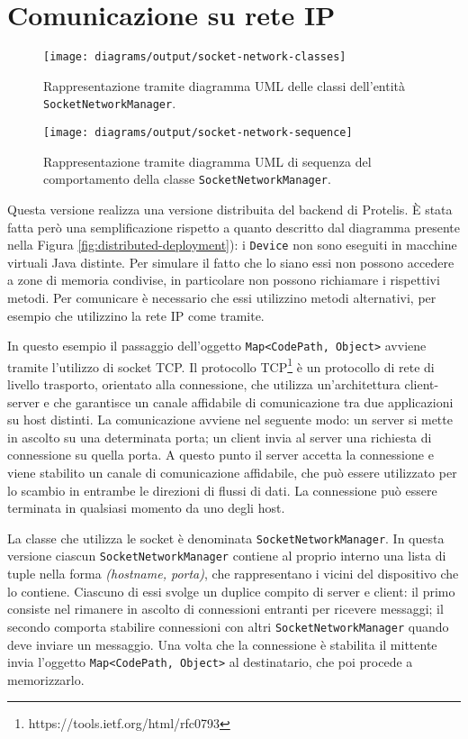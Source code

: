 \section{Comunicazione su rete IP}
\begin{figure}
  \centering
  \texttt{[image: diagrams/output/socket-network-classes]}
  \caption{Rappresentazione tramite diagramma UML delle classi dell'entità
    \texttt{SocketNetworkManager}.}
  \label{fig:socket-network-classes}
\end{figure}
\begin{figure}
  \centering
  \texttt{[image: diagrams/output/socket-network-sequence]}
  \caption{Rappresentazione tramite diagramma UML di sequenza del comportamento
    della classe \texttt{SocketNetworkManager}.}
  \label{fig:socket-network-sequence}
\end{figure}
Questa versione realizza una versione distribuita del backend di Protelis.  È
stata fatta però una semplificazione rispetto a quanto descritto dal diagramma
presente nella Figura \ref{fig:distributed-deployment}): i \texttt{Device} non
sono eseguiti in macchine virtuali Java distinte. Per simulare il fatto che lo
siano essi non possono accedere a zone di memoria condivise, in particolare non
possono richiamare i rispettivi metodi. Per comunicare è necessario che essi
utilizzino metodi alternativi, per esempio che utilizzino la rete IP come
tramite.

In questo esempio il passaggio dell'oggetto \texttt{Map<CodePath, Object>}
avviene tramite l'utilizzo di socket TCP. Il protocollo
TCP\footnote{https://tools.ietf.org/html/rfc0793} è un protocollo di rete di
livello trasporto, orientato alla connessione, che utilizza un'architettura
client-server e che garantisce un canale affidabile di comunicazione tra due
applicazioni su host distinti. La comunicazione avviene nel seguente modo: un
server si mette in ascolto su una determinata porta; un client invia al server
una richiesta di connessione su quella porta. A questo punto il server accetta
la connessione e viene stabilito un canale di comunicazione affidabile, che può
essere utilizzato per lo scambio in entrambe le direzioni di flussi di dati. La
connessione può essere terminata in qualsiasi momento da uno degli host.

La classe che utilizza le socket è denominata \texttt{SocketNetworkManager}. In
questa versione ciascun \texttt{SocketNetworkManager} contiene al proprio
interno una lista di tuple nella forma \textit{(hostname, porta)}, che
rappresentano i vicini del dispositivo che lo contiene. Ciascuno di essi svolge
un duplice compito di server e client: il primo consiste nel rimanere in ascolto
di connessioni entranti per ricevere messaggi; il secondo comporta stabilire
connessioni con altri \texttt{SocketNetworkManager} quando deve inviare un
messaggio. Una volta che la connessione è stabilita il mittente invia l'oggetto
\texttt{Map<CodePath, Object>} al destinatario, che poi procede a memorizzarlo.

